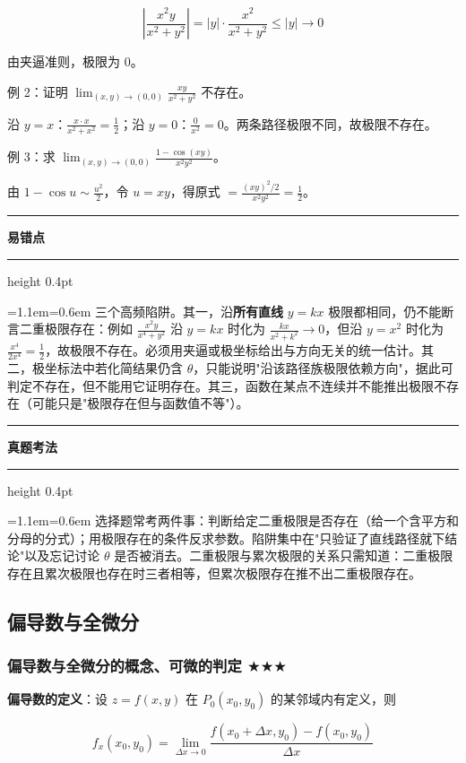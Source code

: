 \documentclass[11pt,openany,UTF8]{ctexbook}
\newcommand{\callouthead}[2]{%
  \par\addvspace{7pt}\noindent
  {\color{#1}\rule[-0.15em]{3pt}{1.05em}}\hspace{0.5em}%
  {\bfseries\color{#1}#2}\par\nobreak\vspace{-0.35em}%
  {\color{rulesep}\hrule height 0.4pt}\nobreak\vspace{0.45em}%
  \begingroup\small\setlength{\parindent}{0pt}%
  \leftskip=1.1em\rightskip=0.6em\noindent\ignorespaces}
\newcommand{\calloutend}{\par\endgroup\addvspace{7pt}}
\newenvironment{callwarn}[1]{\callouthead{warnbar}{#1}}{\calloutend}
\newenvironment{callexam}[1]{\callouthead{exambar}{#1}}{\calloutend}
\begin{document}
\[\left\vert \frac{x^{2}y}{x^{2}+y^{2}}\right\vert =\vert y\vert\cdot\frac{x^{2}}{x^{2}+y^{2}}\le \vert y\vert\to 0\]

由夹逼准则，极限为 $0$。

例 2：证明 $\displaystyle\lim_{(x,y)\to(0,0)}\frac{xy}{x^{2}+y^{2}}$ 不存在。

沿 $y=x$：$\frac{x\cdot x}{x^{2}+x^{2}}=\frac12$；沿 $y=0$：$\frac{0}{x^{2}}=0$。两条路径极限不同，故极限不存在。

例 3：求 $\displaystyle\lim_{(x,y)\to(0,0)}\frac{1-\cos(xy)}{x^{2}y^{2}}$。

由 $1-\cos u\sim \frac{u^{2}}{2}$，令 $u=xy$，得原式 $=\frac{(xy)^{2}/2}{x^{2}y^{2}}=\frac12$。

\begin{callwarn}{易错点}
三个高频陷阱。其一，沿\textbf{所有直线} $y=kx$ 极限都相同，仍不能断言二重极限存在：例如 $\frac{x^{2}y}{x^{4}+y^{2}}$ 沿 $y=kx$ 时化为 $\frac{kx}{x^{2}+k^{2}}\to 0$，但沿 $y=x^{2}$ 时化为 $\frac{x^{4}}{2x^{4}}=\frac12$，故极限不存在。必须用夹逼或极坐标给出与方向无关的统一估计。其二，极坐标法中若化简结果仍含 $\theta$，只能说明"沿该路径族极限依赖方向"，据此可判定不存在，但不能用它证明存在。其三，函数在某点不连续并不能推出极限不存在（可能只是"极限存在但与函数值不等"）。

\end{callwarn}

\begin{callexam}{真题考法}
选择题常考两件事：判断给定二重极限是否存在（给一个含平方和分母的分式）；用极限存在的条件反求参数。陷阱集中在"只验证了直线路径就下结论"以及忘记讨论 $\theta$ 是否被消去。二重极限与累次极限的关系只需知道：二重极限存在且累次极限也存在时三者相等，但累次极限存在推不出二重极限存在。

\end{callexam}

\subsection{偏导数与全微分}

\subsubsection{偏导数与全微分的概念、可微的判定 $\bigstar$$\bigstar$$\bigstar$}

\textbf{偏导数的定义}：设 $z=f(x,y)$ 在 $P_0(x_0,y_0)$ 的某邻域内有定义，则

\[f_x(x_0,y_0)=\lim_{\Delta x\to 0}\frac{f(x_0+\Delta x,y_0)-f(x_0,y_0)}{\Delta x}\]
\end{document}
